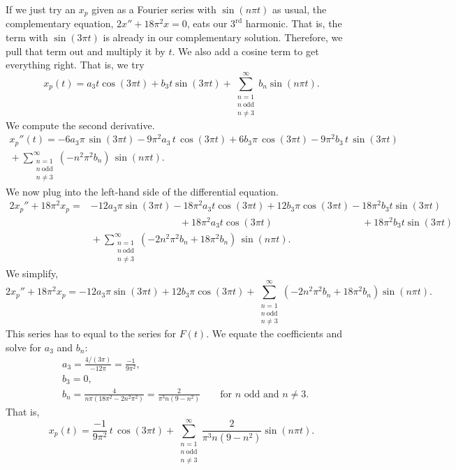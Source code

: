 \begin{example}
If we just try an $x_p$ given as a Fourier series with $\sin (n\pi t)$ as usual,
the complementary equation, $2x''+18\pi^2x=0$, eats our $3^\text{rd}$ harmonic.  That is, the term
with $\sin(3 \pi t)$
is already
in our complementary solution.
Therefore, we pull that term out and
multiply it by $t$.  We also add a cosine term to get everything right.
That is, we try
\begin{equation*}
x_p(t) =
a_3
t \cos (3 \pi t )
+
b_3
t \sin (3 \pi t)
+
\sum_{\substack{n=1 \\ n~\text{odd} \\ n\not= 3}}^\infty
b_n
\sin (n \pi t) . 
\end{equation*}
We compute the second derivative.
\begin{multline*}
x_p''(t) =
- 6 a_3
\pi \, \sin (3 \pi t) - 9\pi^2 a_3 \, t \, \cos (3 \pi t)
+
6 b_3
\pi \, \cos (3 \pi t) - 9\pi^2 b_3 \, t \, \sin (3 \pi t)
\\
{} +
\sum_{\substack{n=1 \\ n~\text{odd} \\ n\not= 3}}^\infty
(-n^2 \pi^2 b_n ) \,
\sin (n \pi t) . 
\end{multline*}
We now plug into the left-hand side of the differential equation.
\begin{align*}
2x_p'' + 18\pi^2 x_p 
= & 
- 12 a_3 \pi \sin (3 \pi t)
- 18\pi^2 a_3 t \cos (3 \pi t)
+ 12 b_3 \pi \cos (3 \pi t)
- 18\pi^2 b_3 t \sin (3 \pi t)
\\
& \phantom{\, - 12 a_3 \pi \sin (3 \pi t)} ~
{} + 18 \pi^2 a_3 t \cos (3 \pi t)
\phantom{\, + 12 b_3 \pi \cos (3 \pi t)} ~
{} + 18 \pi^2 b_3 t \sin (3 \pi t)
\\
& {} + \sum_{\substack{n=1 \\ n~\text{odd} \\ n\not= 3}}^\infty
(-2n^2 \pi^2 b_n + 18\pi^2 b_n) \,
\sin (n \pi t) . 
\end{align*}
We simplify,
\begin{equation*}
2x_p'' + 18\pi^2 x_p =
- 12 a_3
\pi \sin (3 \pi t)
+
12 b_3
\pi \cos (3 \pi t)
+
\sum_{\substack{n=1 \\ n~\text{odd} \\ n\not= 3}}^\infty
(-2n^2 \pi^2 b_n + 18\pi^2 b_n)
\sin (n \pi t) . 
\end{equation*}
This series has to equal to the series for $F(t)$.
We equate the coefficients and solve for $a_3$ and $b_n$:
\begin{align*}
& a_3 = \frac{4/(3\pi)}{-12\pi} = \frac{-1}{9\pi^2} , \\
& b_3 = 0 , \\
& b_n = \frac{4}{n\pi(18\pi^2 - 2n^2 \pi^2)} 
= \frac{2}{\pi^3 n(9 - n^2)} \qquad \text{for } n \text{ odd and } n\not=3 .
\end{align*}
That is,
\begin{equation*}
x_p(t) =
\frac{-1}{9\pi^2}
\,
t \, \cos (3 \pi t)
+
\sum_{\substack{n=1 \\ n~\text{odd} \\ n\not= 3}}^\infty
\frac{2}{\pi^3 n(9 - n^2)}
\sin (n \pi t) . 
\end{equation*}
\end{example}

